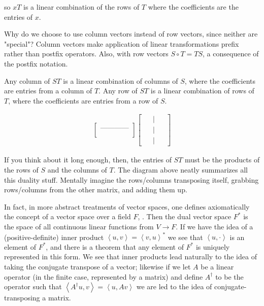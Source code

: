 \documentclass{article}
\begin{document}
so $xT$ is a linear combination of the rows of $T$ where the coefficients are the entries of $x$. 

Why do we choose to use column vectors instead of row vectors, since neither are "special"? Column vectors make application of linear transformations prefix rather than postfix operators. Also, with row vectors $S \circ T = TS$, a consequence of the postfix notation.

Any column of $ST$ is a linear combination of columns of $S$, where the coefficients are entries from a column of $T$. Any row of $ST$ is a linear combination of rows of $T$, where the coefficients are entries from a row of $S$. 

\begin{align}
\begin{bmatrix}
\\
\mbox{------------}\\
\\
\end{bmatrix}
\begin{bmatrix}
\ \ & \big| &\ \ \\
\ \ & \big| &\ \ \\
\ \ & \big| &\ \ 
\end{bmatrix}
\end{align}

If you think about it long enough, then, the entries of $ST$ must be the products of the rows of $S$ and the columns of $T$. The diagram above neatly summarizes all this duality stuff. Mentally imagine the rows/columns transposing itself, grabbing rows/columns from the other matrix, and adding them up.

In fact, in more abstract treatments of vector spaces, one defines axiomatically the concept of a vector space over a field $F$, . Then the dual vector space $F^*$ is the space of all continuous linear functions from $V \rightarrow F$. If we have the idea of a (positive-definite) inner product $\left<u,v\right> = \left<v,u\right>^*$ we see that $\left<u,\cdot\right>$ is an element of $F^*$, and there is a theorem that any element of $F^*$ is uniquely represented in this form. We see that inner products lead naturally to the idea of taking the conjugate transpose of a vector; likewise if we let $A$ be a linear operator (in the finite case, represented by a matrix) and define $A^\dagger$ to be the operator such that $\left<A^\dagger u, v\right>= \left<u, Av\right>$ we are led to the idea of conjugate-transposing a matrix.
\end{document}
